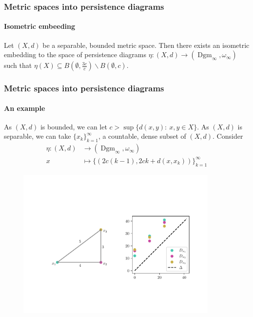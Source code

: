 \documentclass[aspectratio=169]{beamer}
\newcommand{\dgmi}{\operatorname{Dgm}_\infty}
\newcommand{\wdi}{\omega_\infty}
\begin{document}
  \begin{frame}
    \frametitle{Metric spaces into persistence diagrams}
    \framesubtitle{Isometric embeeding}
    \begin{theorem}
      Let $ (X, d) $ be a separable, bounded metric space. Then there exists an isometric embedding to the space of persistence diagrams $ \eta: (X, d) \to (\dgmi, \wdi)$ such that $ \eta(X) \subseteq B(\emptyset, \frac{3c}{c}) \backslash B(\emptyset, c) $.
    \end{theorem}
  \end{frame}
  \begin{frame}
    \frametitle{Metric spaces into persistence diagrams}
    \framesubtitle{An example}
    As $ (X, d) $ is bounded, we can let $ c > \sup \{d(x, y): \  x, y \in X\} $. As $ (X, d) $ is separable, we can take $ \{x_k\}_{k=1}^\infty $, a countable, dense subset of $ (X, d) $. Consider
      \begin{align*}
          \eta: (X, d) &\to (\dgmi, \wdi) \\
          x &\mapsto \{(2c(k-1), 2ck + d(x, x_k))\}_{k=1}^\infty
      \end{align*}
    \begin{figure}
      \includegraphics[trim={0 0 0 3cm},clip, width=10cm]{../Figures/figure-2.pdf}
    \end{figure}
  \end{frame}
\end{document}
